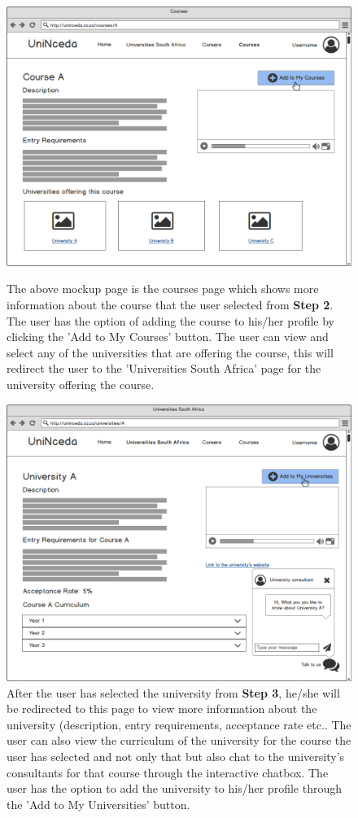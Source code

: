 \documentclass[a4paper, 12pt]{article}
\begin{document}
\begin{figure}[H]
\centering
\includegraphics[scale=0.35]{Courses}
\caption{\small \small{The above mockup page is the courses page which shows more information about the course that the user selected from \textbf{Step 2}. The user has the option of adding the course to his/her profile by clicking the 'Add to My Courses' button. The user can view and select any of the universities that are offering the course, this will redirect the user to the 'Universities South Africa' page for the university offering the course.}}
\label{Courses}

\vspace{1cm}

\includegraphics[scale=0.35]{UniversitiesPage1}
\caption{\small \small{After the user has selected the university from \textbf{Step 3}, he/she will be redirected to this page to view more information about the university (description, entry requirements, acceptance rate etc.}. The user can also view the curriculum of the university for the course  the user has selected and not only that but also chat to the university's consultants for that course through the interactive chatbox. The user has the option to add the university to his/her profile through the 'Add to My Universities' button.}
\label{UniversitiesPage1}
\end{figure}
\end{document}
